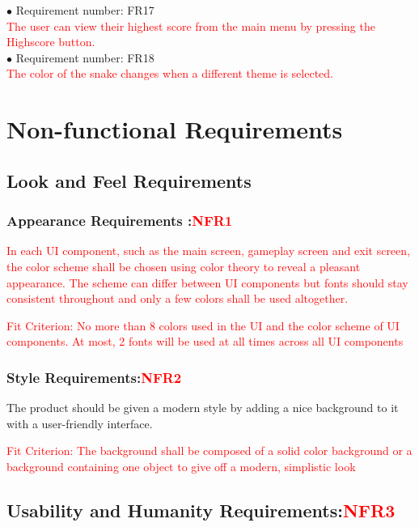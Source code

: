 \documentclass[12pt, titlepage]{article}
\begin{document}
$\bullet$ Requirement number: FR17\\
\textcolor{red}{The user can view their highest score from the main menu by pressing the Highscore button.}\\

$\bullet$ Requirement number: FR18\\
\textcolor{red}{The color of the snake changes when a different theme is selected.}\\


\section{Non-functional Requirements}

\subsection{Look and Feel Requirements}

\subsubsection{Appearance Requirements :\textcolor{red}{NFR1}}

 \textcolor{red}{In each UI component, such as the main screen, gameplay screen and exit screen, the color scheme shall be chosen using color theory to reveal a pleasant appearance. The scheme can differ between UI components but fonts should stay consistent throughout and only a few colors shall be used altogether. }


\textcolor{red}{Fit Criterion: No more than 8 colors used in the UI and the color scheme of UI components. At most, 2 fonts will be used at all times across all UI components}
\subsubsection{Style Requirements:\textcolor{red}{NFR2}}

The product should be given a modern style by adding a nice background to it with a user-friendly interface.

\textcolor{red}{Fit Criterion: The background shall be composed of a solid color background or a background containing one object to give off a modern, simplistic look }
\subsection{Usability and Humanity Requirements:\textcolor{red}{NFR3}}
\end{document}
